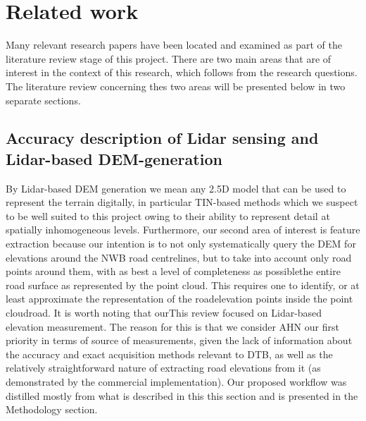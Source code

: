 
\chapter{Related work}
\label{chap:rw}

Many relevant research papers have been located and examined as part of the literature review stage of this project. There are two main areas that are of interest in the context of this research, which follows from the research questions. The literature review concerning thes two areas will be presented below in two separate sections.

\section*{Accuracy description of Lidar sensing and Lidar-based DEM-generation}

By Lidar-based DEM generation we mean any 2.5D model that can be used to represent the terrain digitally, in particular TIN-based methods which we suspect to be well suited to this project owing to their ability to represent detail at spatially inhomogeneous levels. Furthermore, our second area of interest is feature extraction because our intention is to not only systematically query the DEM for elevations around the NWB road centrelines, but to take into account only road points around them, with as best a level of completeness as possiblethe entire road surface as represented by the point cloud. This requires one to identify, or at least approximate the representation of the roadelevation points inside the point cloudroad. It is worth noting that ourThis review focused on Lidar-based elevation measurement. The reason for this is that we consider AHN our first priority in terms of source of measurements, given the lack of information about the accuracy and exact acquisition methods relevant to DTB, as well as the relatively straightforward nature of extracting road elevations from it (as demonstrated by the commercial implementation). Our proposed workflow was distilled mostly from what is described in this this section and is presented in the Methodology section.